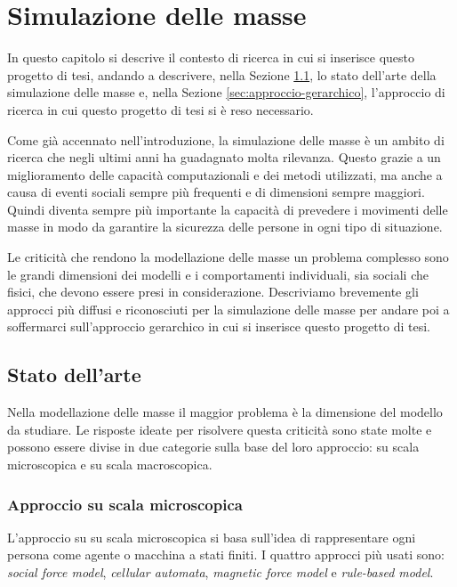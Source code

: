 \chapter{Simulazione delle masse}

In questo capitolo si descrive il contesto di ricerca in cui si inserisce questo progetto di tesi, andando a descrivere, nella Sezione \ref{sec:stato-dell-arte}, lo stato dell'arte della simulazione delle masse e, nella Sezione \ref{sec:approccio-gerarchico}, l'approccio di ricerca in cui questo progetto di tesi si è reso necessario.

\label{sec:simulazione-masse}
Come già accennato nell'introduzione, la simulazione delle masse è un ambito di ricerca che negli ultimi anni ha guadagnato molta rilevanza. Questo grazie a un miglioramento delle capacità computazionali e dei metodi utilizzati, ma anche a causa di eventi sociali sempre più frequenti e di dimensioni sempre maggiori. Quindi diventa sempre più importante la capacità di prevedere i movimenti delle masse in modo da garantire la sicurezza delle persone in ogni tipo di situazione.

Le criticità che rendono la modellazione delle masse un problema complesso sono le grandi dimensioni dei modelli e i comportamenti individuali, sia sociali che fisici, che devono essere presi in considerazione. Descriviamo brevemente gli approcci più diffusi e riconosciuti per la simulazione delle masse per andare poi a soffermarci sull'approccio gerarchico in cui si inserisce questo progetto di tesi.

\section{Stato dell'arte}
\label{sec:stato-dell-arte}

Nella modellazione delle masse il maggior problema è la dimensione del modello da studiare. Le risposte ideate per risolvere questa criticità sono state molte e possono essere divise in due categorie sulla base del loro approccio: su scala microscopica e su scala macroscopica.

\subsection{Approccio su scala microscopica}

L'approccio su su scala microscopica si basa sull'idea di rappresentare ogni persona come agente o macchina a stati finiti. I quattro approcci più usati sono: \textit{social force model}, \textit{cellular automata}, \textit{magnetic force model} e \textit{rule-based model}.

